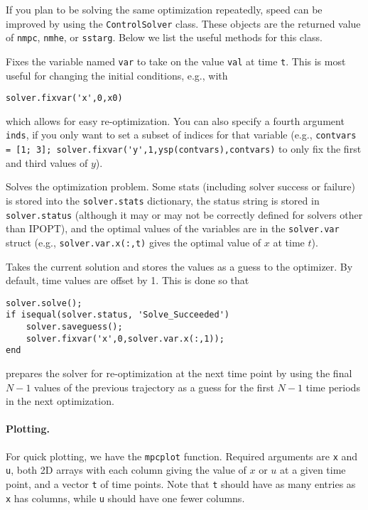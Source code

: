 \documentclass{article}
\begin{document}
\begin{multicols}{2}
If you plan to be solving the same optimization repeatedly, speed can be improved by using the \texttt{ControlSolver} class.
These objects are the returned value of \texttt{nmpc}, \texttt{nmhe}, or \texttt{sstarg}.
Below we list the useful methods for this class.


Fixes the variable named \texttt{var} to take on the value \texttt{val} at time \texttt{t}.
This is most useful for changing the initial conditions, e.g., with
%
\begin{lstlisting}[frame=L]
solver.fixvar('x',0,x0)
\end{lstlisting}
%
which allows for easy re-optimization.
You can also specify a fourth argument \texttt{inds}, if you only want to set a subset of indices for that variable (e.g., \lstinline|contvars = [1; 3]; solver.fixvar('y',1,ysp(contvars),contvars)| to only fix the first and third values of $y$).


Solves the optimization problem.
Some stats (including solver success or failure) is stored into the \texttt{solver.stats} dictionary, the status string is stored in \texttt{solver.status} (although it may or may not be correctly defined for solvers other than IPOPT), and the optimal values of the variables are in the \texttt{solver.var} struct (e.g., \lstinline|solver.var.x(:,t)| gives the optimal value of $x$ at time $t$).


Takes the current solution and stores the values as a guess to the optimizer.
By default, time values are offset by 1. This is done so that
%
\begin{lstlisting}[frame=L]
solver.solve();
if isequal(solver.status, 'Solve_Succeeded')
    solver.saveguess();
    solver.fixvar('x',0,solver.var.x(:,1));
end
\end{lstlisting}
%
prepares the solver for re-optimization at the next time point by using the final $N-1$ values of the previous trajectory as a guess for the first $N-1$ time periods in the next optimization.

\paragraph{Plotting.}

For quick plotting, we have the \texttt{mpcplot} function.
Required arguments are \texttt{x} and \texttt{u}, both 2D arrays with each column giving the value of $x$ or $u$ at a given time point, and a vector \texttt{t} of time points.
Note that \texttt{t} should have as many entries as \texttt{x} has columns, while \texttt{u} should have one fewer columns.


\end{multicols}
\end{document}
